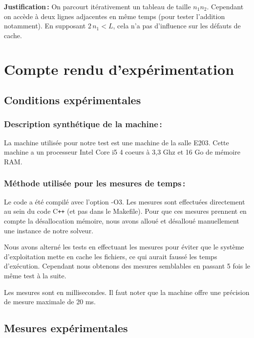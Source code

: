 \documentclass[a4paper, 10pt, french]{article}
\begin{document}
     \textbf{Justification\,:} On parcourt itérativement un tableau de taille $n_1n_2$. Cependant on accède à deux lignes adjacentes en même temps (pour tester l'addition notamment). En supposant $2 \, n_1 < L$, cela n'a pas d'influence sur les défauts de cache.


\section{Compte rendu d'expérimentation}
  \subsection{Conditions expérimentales}

    \subsubsection{Description synthétique de la machine\,:} 

    La machine utilisée pour notre test est une machine de la salle E203.
    Cette machine a un processeur Intel Core i5 4 coeurs à 3,3 Ghz et 16 Go de mémoire RAM.

    \subsubsection{Méthode utilisée pour les mesures de temps\,: } 

    Le code a été compilé avec l'option -O3.
    Les mesures sont effectuées directement au sein du code C\texttt{++} (et pas dans le Makefile).
    Pour que ces mesures prennent en compte la désallocation mémoire, nous avons
    alloué et désalloué manuellement une instance de notre solveur.

    Nous avons alterné les tests en effectuant les mesures pour éviter que
    le système d'exploitation mette en cache les fichiers, ce qui aurait faussé les temps d'exécution.
    Cependant nous obtenons des mesures semblables en passant 5 fois le même test à la suite.

    Les mesures sont en millisecondes.
    Il faut noter que la machine offre une précision de mesure maximale de 20 ms.

  \subsection{Mesures expérimentales}
\end{document}
